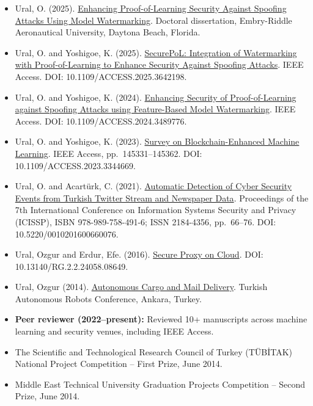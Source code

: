 \documentclass[10pt,a4paper]{article}
\begin{document}
\begin{itemize}
  \item
    {
      Ural, O. (2025). \href{https://commons.erau.edu/edt/905/}{Enhancing Proof-of-Learning Security Against Spoofing Attacks Using Model Watermarking}. Doctoral dissertation, Embry-Riddle Aeronautical University, Daytona Beach, Florida.
    }
  \item
    {
      Ural, O. and Yoshigoe, K. (2025). \href{https://ieeexplore.ieee.org/document/11293969}{SecurePoL: Integration of Watermarking with Proof-of-Learning to Enhance Security Against Spoofing Attacks}. IEEE Access. DOI: 10.1109/ACCESS.2025.3642198.
    }
  \item
    {
      Ural, O. and Yoshigoe, K. (2024). \href{https://ieeexplore.ieee.org/abstract/document/10741282}{Enhancing Security of Proof-of-Learning against Spoofing Attacks using Feature-Based Model Watermarking}. IEEE Access. DOI: 10.1109/ACCESS.2024.3489776.
    }
  \item
    {
      Ural, O. and Yoshigoe, K. (2023). \href{https://doi.org/10.1109/ACCESS.2023.3344669}{Survey on Blockchain-Enhanced Machine Learning}. IEEE Access, pp.\ 145331--145362. DOI: 10.1109/ACCESS.2023.3344669.
    }
  \item
    {
      Ural, O. and Acartürk, C. (2021). \href{https://www.scitepress.org/Papers/2021/102016/102016.pdf}{Automatic Detection of Cyber Security Events from Turkish Twitter Stream and Newspaper Data}. Proceedings of the 7th International Conference on Information Systems Security and Privacy (ICISSP), ISBN 978-989-758-491-6; ISSN 2184-4356, pp.\ 66--76. DOI: 10.5220/0010201600660076.
    }
  \item
    {
      Ural, Ozgur and Erdur, Efe. (2016). \href{https://www.researchgate.net/publication/316102682_Secure_Proxy_on_Cloud}{Secure Proxy on Cloud}. DOI: 10.13140/RG.2.2.24058.08649.
    }
  \item
    {
      Ural, Ozgur (2014). \href{http://senior.ceng.metu.edu.tr/2014/clover}{Autonomous Cargo and Mail Delivery}. Turkish Autonomous Robots Conference, Ankara, Turkey.
    }
  \item
    {
      \textbf{Peer reviewer (2022--present):} Reviewed 10+ manuscripts across machine learning and security venues, including IEEE Access.
    }
\end{itemize}

\spacedhrule{0.9em}{0.1em}

\begin{itemize}
    \item The Scientific and Technological Research Council of Turkey (TÜBİTAK) National Project Competition -- First Prize, June 2014.
    \item Middle East Technical University Graduation Projects Competition -- Second Prize, June 2014.
\end{itemize}
\end{document}
